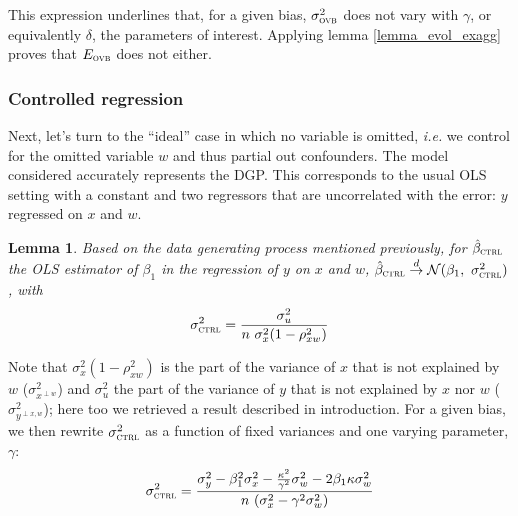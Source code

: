 \documentclass[usletter, 12pt]{article}
\newtheorem{lemma}{Lemma}
\begin{document}
			 This expression underlines that, for a given bias,  $\sigma_{\textsc{ovb}}^{2}$ does not vary with $\gamma$, or equivalently $\delta$, the parameters of interest. Applying lemma \ref{lemma_evol_exagg} proves that $E_{\textsc{ovb}}$ does not either.

			
			\subsubsection{Controlled regression}
			
				Next, let's turn to the ``ideal'' case in which no variable is omitted, \textit{i.e.} we control for the omitted variable $w$ and thus partial out confounders. The model considered accurately represents the DGP.
%				
				This corresponds to the usual OLS setting with a constant and two regressors that are uncorrelated with the error: $y$ regressed on $x$ and $w$.
						
				\begin{lemma}\label{lemma_ctrl}
					Based on the data generating process mentioned previously, for $\hat{\beta}_{\textsc{ctrl}}$ the OLS estimator of $\beta_{1}$ in the regression of $y$ on $x$ and $w$, $\hat{\beta}_{\textsc{ctrl}} \overset{d}{\to} \mathcal{N}(\beta_{1}, \ \sigma_{\textsc{ctrl}}^{2})$, with
					\[
						\sigma_{\textsc{ctrl}}^{2} = \dfrac{\sigma_{u}^{2}}{n \ \sigma_{x}^{2} (1 - \rho_{xw}^{2})}
					\]
				\end{lemma}
				
				Note that $\sigma_{x}^{2} (1 - \rho_{xw}^{2})$ is the part of the variance of $x$ that is not explained by $w$ ($\sigma^{2}_{x^{\perp w}}$) and $\sigma_{u}^{2}$ the part of the variance of $y$ that is not explained by $x$ nor $w$ ($\sigma^{2}_{y^{\perp x, w}}$); here too we retrieved a result described in introduction. For a given bias, we then rewrite $\sigma_{\textsc{ctrl}}^{2}$ as a function of fixed variances and one varying parameter, $\gamma$:
				~
				\[
					\sigma_{\textsc{ctrl}}^{2} = \dfrac{\sigma_{y}^{2} - \beta_{1}^{2}\sigma_{x}^{2} - \frac{\kappa^{2}}{\gamma^{2}}\sigma_{w}^{2} - 2\beta_{1}\kappa \sigma_{w}^{2}}{n \ (\sigma_{x}^{2}  - \gamma^{2} \sigma_{w}^{2})}
				\]
				
\end{document}
